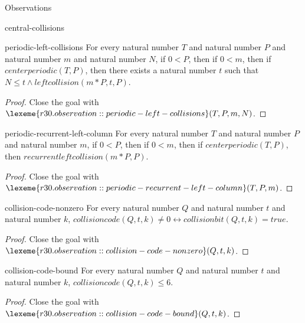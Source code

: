 \begin{lexlean}{Observations}
\begin{section}{central-collisions}
\begin{theorem}{periodic-left-collisions}
For every natural number \(T\) and natural number \(P\) and natural number \(m\) and natural number \(N\), if \(0 < P\), then if \(0 < m\), then if \(centerperiodic(T, P)\), then there exists a natural number \(t\) such that \(N ≤ t ∧ leftcollision(m * P, t, P)\).
\begin{proof}
Close the goal with \(\lexeme{r30.observation::periodic-left-collisions}(T, P, m, N)\).
\end{proof}
\end{theorem}

\begin{theorem}{periodic-recurrent-left-column}
For every natural number \(T\) and natural number \(P\) and natural number \(m\), if \(0 < P\), then if \(0 < m\), then if \(centerperiodic(T, P)\), then \(recurrentleftcollision(m * P, P)\).
\begin{proof}
Close the goal with \(\lexeme{r30.observation::periodic-recurrent-left-column}(T, P, m)\).
\end{proof}
\end{theorem}

\begin{theorem}{collision-code-nonzero}
For every natural number \(Q\) and natural number \(t\) and natural number \(k\), \(collisioncode(Q, t, k) ≠ 0 ↔ collisionbit(Q, t, k) = true\).
\begin{proof}
Close the goal with \(\lexeme{r30.observation::collision-code-nonzero}(Q, t, k)\).
\end{proof}
\end{theorem}

\begin{theorem}{collision-code-bound}
For every natural number \(Q\) and natural number \(t\) and natural number \(k\), \(collisioncode(Q, t, k) ≤ 6\).
\begin{proof}
Close the goal with \(\lexeme{r30.observation::collision-code-bound}(Q, t, k)\).
\end{proof}
\end{theorem}


\end{section}
\end{lexlean}

